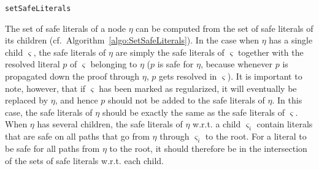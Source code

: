 \begin{algorithm}[!b]
\begin{footnotesize}



\BlankLine

\caption{\label{algo:SetSafeLiterals} \texttt{setSafeLiterals}}
\end{footnotesize}
\end{algorithm}


The set of safe literals of a node $\eta$ can be computed from the set of safe
literals of its children (cf.\ Algorithm~\ref{algo:SetSafeLiterals}). In the case when $\eta$ has a single child $\varsigma$, the safe literals of $\eta$ are simply the safe literals of $\varsigma$ together with the resolved literal $p$ of $\varsigma$ belonging to $\eta$ ($p$ is safe for $\eta$, because whenever $p$ is propagated down the proof through $\eta$, $p$ gets resolved in $\varsigma$). It is important to note, however, that if $\varsigma$ has been marked as regularized, it will eventually be replaced by $\eta$, and hence $p$ should not be added to the safe literals of $\eta$. In this case, the safe literals of $\eta$ should be exactly the same as the safe literals of $\varsigma$. When $\eta$ has several children, the safe literals of $\eta$ w.r.t. a child $\varsigma_i$ contain literals that are safe on all paths that go from $\eta$ through $\varsigma_i$ to the root. For a literal to be safe for all paths from $\eta$ to the root, it should therefore be in the intersection of the sets of safe literals w.r.t. each child.


